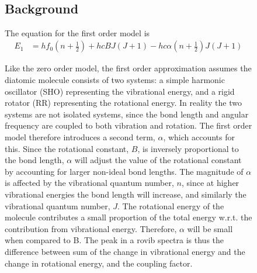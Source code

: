 \documentclass[titlepage]{article}
\newcommand{\usesubsection}[1]{\subsection*{#1}
\addcontentsline{toc}{subsection}{\protect\numberline{}#1}}
\begin{document}
\begin{figure}[hbtp]
    ~\usesubsection{Background}
    The equation for the first order model is 
    \begin{align*}
        E_{1} &= h f_{0} \left(
            n + \frac{1}{2}
        \right) + hc BJ \left(
            J + 1
        \right) - h c \alpha \left(
            n + \frac{1}{2}
        \right)J\left(J+1\right)
    \end{align*}
    
    Like the zero order model, the first order approximation assumes the diatomic molecule consists of two systems: a simple harmonic oscillator (SHO) representing the vibrational energy, and a rigid rotator (RR) representing the rotational energy.  In reality the two systems are not isolated systems, since the bond length and angular frequency are coupled
    to both vibration and rotation. The first order model 
    therefore introduces a second term, \(\alpha\), which 
    accounts for this. 
    Since the rotational constant, \(B\), is inversely proportional to the bond length, \(\alpha\) will adjust the value of the rotational constant by accounting for larger non-ideal bond lengths. The magnitude of \(\alpha\) is affected by the vibrational quantum number, \(n\), since at higher vibrational energies the bond length will increase, and similarly the vibrational quantum number, \(J\). 
    The rotational energy of the molecule contributes a small proportion of the 
    total energy w.r.t. the contribution from vibrational energy. Therefore, 
    \(\alpha\) will be small when compared to B.
    The peak in a rovib spectra is thus the difference between sum of the change in vibrational energy and the change in rotational energy, and the coupling factor. 


\end{figure}
\end{document}
